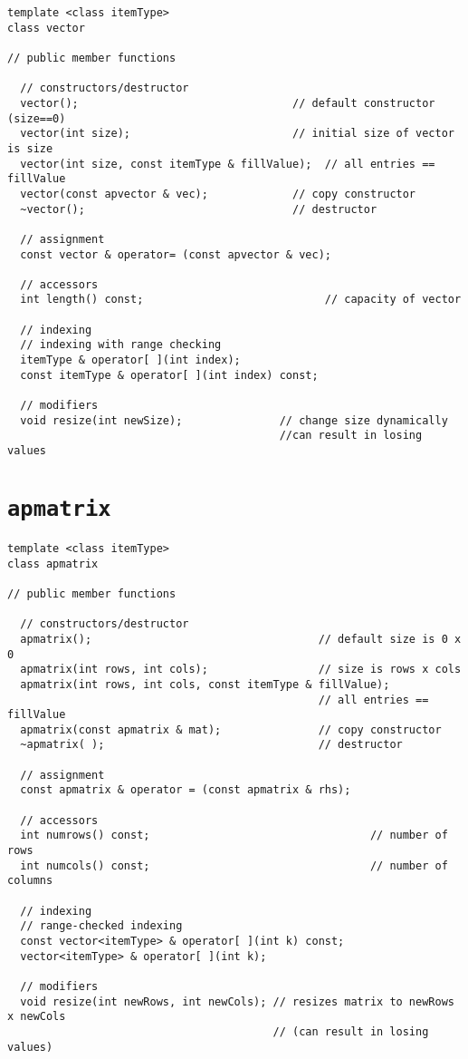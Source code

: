 \begin{lstlisting}
template <class itemType>
class vector

// public member functions

  // constructors/destructor
  vector();                                 // default constructor (size==0)
  vector(int size);                         // initial size of vector is size
  vector(int size, const itemType & fillValue);  // all entries == fillValue
  vector(const apvector & vec);             // copy constructor
  ~vector();                                // destructor

  // assignment
  const vector & operator= (const apvector & vec);

  // accessors
  int length() const;                            // capacity of vector

  // indexing
  // indexing with range checking
  itemType & operator[ ](int index);           
  const itemType & operator[ ](int index) const;

  // modifiers
  void resize(int newSize);               // change size dynamically
                                          //can result in losing values
\end{lstlisting}

\section{{\tt apmatrix}}

\begin{lstlisting}
template <class itemType>
class apmatrix

// public member functions

  // constructors/destructor
  apmatrix();                                   // default size is 0 x 0
  apmatrix(int rows, int cols);                 // size is rows x cols
  apmatrix(int rows, int cols, const itemType & fillValue);
                                                // all entries == fillValue
  apmatrix(const apmatrix & mat);               // copy constructor
  ~apmatrix( );                                 // destructor

  // assignment
  const apmatrix & operator = (const apmatrix & rhs);

  // accessors
  int numrows() const;                                  // number of rows
  int numcols() const;                                  // number of columns

  // indexing
  // range-checked indexing
  const vector<itemType> & operator[ ](int k) const;  
  vector<itemType> & operator[ ](int k);

  // modifiers
  void resize(int newRows, int newCols); // resizes matrix to newRows x newCols
                                         // (can result in losing values)
\end{lstlisting}

